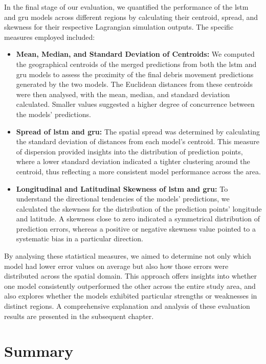 In the final stage of our evaluation, we quantified the performance of the \acrshort{lstm} and \acrshort{gru} models across different regions by calculating their centroid, spread, and skewness for their respective Lagrangian simulation outputs. The specific measures employed included:

\begin{itemize}
    \item \textbf{Mean, Median, and Standard Deviation of Centroids:} We computed the geographical centroids of the merged predictions from both the \acrshort{lstm} and \acrshort{gru} models to assess the proximity of the final debris movement predictions generated by the two models. The Euclidean distances from these centroids were then analysed, with the mean, median, and standard deviation calculated. Smaller values suggested a higher degree of concurrence between the models' predictions.
    \item \textbf{Spread of \acrshort{lstm} and \acrshort{gru}:} The spatial spread was determined by calculating the standard deviation of distances from each model's centroid. This measure of dispersion provided insights into the distribution of prediction points, where a lower standard deviation indicated a tighter clustering around the centroid, thus reflecting a more consistent model performance across the area.
    \item \textbf{Longitudinal and Latitudinal Skewness of \acrshort{lstm} and \acrshort{gru}:} To understand the directional tendencies of the models' predictions, we calculated the skewness for the distribution of the prediction points' longitude and latitude. A skewness close to zero indicated a symmetrical distribution of prediction errors, whereas a positive or negative skewness value pointed to a systematic bias in a particular direction.
\end{itemize}

By analysing these statistical measures, we aimed to determine not only which model had lower error values on average but also how those errors were distributed across the spatial domain. This approach offers insights into whether one model consistently outperformed the other across the entire study area, and also explores whether the models exhibited particular strengths or weaknesses in distinct regions. A comprehensive explanation and analysis of these evaluation results are presented in the subsequent chapter.

\section{Summary}
\label{sec:3.6}

